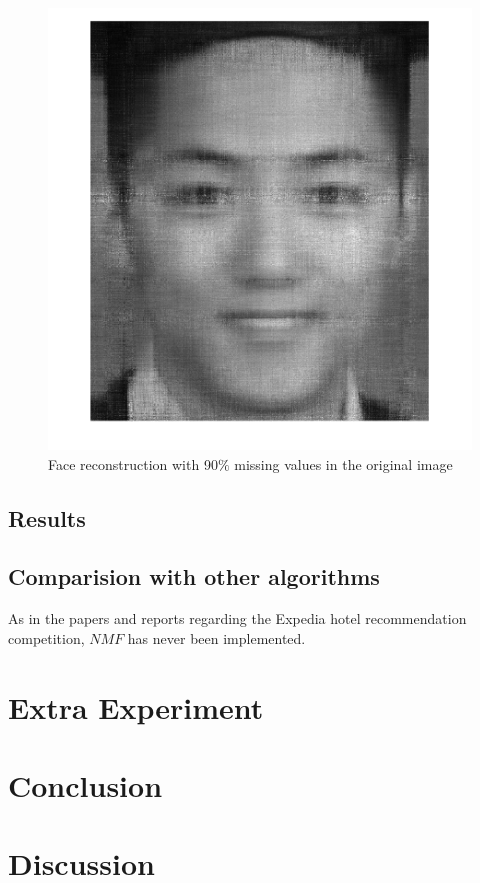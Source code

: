 \documentclass[11pt]{article} %
\begin{document}
\begin{figure}[!htb]
  \includegraphics[width=\linewidth]{mySelfie90M100R.png}
  \caption{Face reconstruction with 90$\%$ missing values in the original image}\label{fig:siefie3}
\endminipage
\end{figure}
\subsection{Results}
\subsection{Comparision with other algorithms}
As in the papers and reports regarding the Expedia hotel recommendation competition, $NMF$ has never been implemented.
\section{Extra Experiment}


\section{Conclusion}


\section{Discussion}
\end{document}
